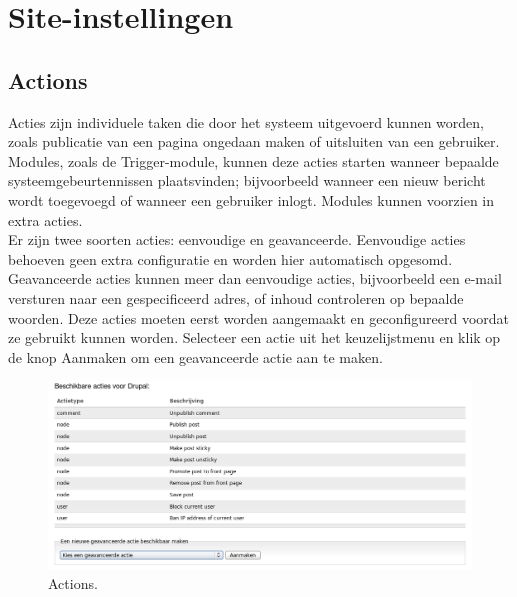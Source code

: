 \chapter{Site-instellingen}
\section{Actions}

Acties zijn individuele taken die door het systeem uitgevoerd kunnen worden, zoals publicatie 
van een pagina ongedaan maken of uitsluiten van een gebruiker. Modules, zoals de
Trigger-module,  kunnen deze acties starten wanneer
bepaalde systeemgebeurtennissen plaatsvinden; bijvoorbeeld wanneer een nieuw bericht wordt toegevoegd of wanneer een gebruiker inlogt. Modules kunnen 
voorzien in extra acties.
\\
Er zijn twee soorten acties: eenvoudige en geavanceerde. Eenvoudige acties behoeven geen extra 
configuratie en worden hier automatisch opgesomd. Geavanceerde acties kunnen meer dan eenvoudige 
acties, bijvoorbeeld een e-mail versturen naar een gespecificeerd adres, of inhoud controleren 
op bepaalde woorden. Deze acties moeten eerst worden aangemaakt en geconfigureerd voordat ze 
gebruikt kunnen worden. Selecteer een actie uit het keuzelijstmenu en klik op de knop Aanmaken 
om een geavanceerde actie aan te maken.
\begin{figure}[!h]
    \centering
   \includegraphics[scale=0.3,angle=0]{Actions}
   \caption{Actions.\label{white}}
 \end{figure}

